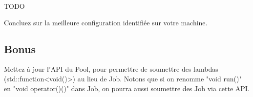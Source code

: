 \begin{prof}

TODO

\end{prof}

\question Concluez sur la meilleure configuration identifiée sur votre machine.


\subsection{Bonus}

\question Mettez à jour l'API du Pool, pour permettre de soumettre des lambdas (std::function<void()>)
au lieu de Job. 
Notons que si on renomme "void run()" en "void operator()()" dans Job, on pourra aussi soumettre des Job via cette API.


